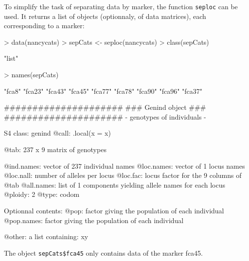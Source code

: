 \documentclass{article}
\begin{document}
To simplify the task of separating data by marker, the function
\texttt{seploc} can be used.
It returns a list of objects (optionnaly, of data matrices), each
corresponding to a marker:
\begin{Schunk}
\begin{Sinput}
> data(nancycats)
> sepCats <- seploc(nancycats)
> class(sepCats)
\end{Sinput}
\begin{Soutput}
[1] "list"
\end{Soutput}
\begin{Sinput}
> names(sepCats)
\end{Sinput}
\begin{Soutput}
[1] "fca8"  "fca23" "fca43" "fca45" "fca77" "fca78" "fca90" "fca96" "fca37"
\end{Soutput}
\begin{Soutput}
   #####################
   ### Genind object ### 
   #####################
- genotypes of individuals - 

S4 class:  genind
@call: .local(x = x)

@tab:  237 x 9 matrix of genotypes

@ind.names: vector of  237 individual names
@loc.names: vector of  1 locus names
@loc.nall: number of alleles per locus
@loc.fac: locus factor for the  9 columns of @tab
@all.names: list of  1 components yielding allele names for each locus
@ploidy:  2
@type:  codom

Optionnal contents: 
@pop:  factor giving the population of each individual
@pop.names:  factor giving the population of each individual

@other: a list containing: xy 
\end{Soutput}
\end{Schunk}

\noindent The object \texttt{sepCats\$fca45} only contains data of the
marker fca45.
\\
\end{document}
